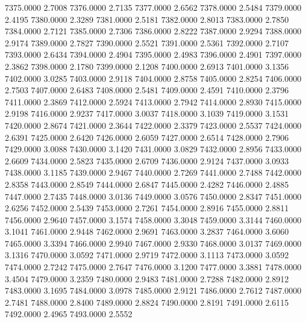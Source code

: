 7375.0000      2.7008
7376.0000      2.7135
7377.0000      2.6562
7378.0000      2.5484
7379.0000      2.4195
7380.0000      2.3289
7381.0000      2.5181
7382.0000      2.8013
7383.0000      2.7850
7384.0000      2.7121
7385.0000      2.7306
7386.0000      2.8222
7387.0000      2.9294
7388.0000      2.9174
7389.0000      2.7827
7390.0000      2.5521
7391.0000      2.5361
7392.0000      2.7107
7393.0000      2.6434
7394.0000      2.4904
7395.0000      2.4983
7396.0000      2.4901
7397.0000      2.3862
7398.0000      2.1780
7399.0000      2.1208
7400.0000      2.6913
7401.0000      3.1356
7402.0000      3.0285
7403.0000      2.9118
7404.0000      2.8758
7405.0000      2.8254
7406.0000      2.7503
7407.0000      2.6483
7408.0000      2.5481
7409.0000      2.4591
7410.0000      2.3796
7411.0000      2.3869
7412.0000      2.5924
7413.0000      2.7942
7414.0000      2.8930
7415.0000      2.9198
7416.0000      2.9237
7417.0000      3.0037
7418.0000      3.1039
7419.0000      3.1531
7420.0000      2.8674
7421.0000      2.3644
7422.0000      2.3379
7423.0000      2.5537
7424.0000      2.6391
7425.0000      2.6420
7426.0000      2.6059
7427.0000      2.6514
7428.0000      2.7906
7429.0000      3.0088
7430.0000      3.1420
7431.0000      3.0829
7432.0000      2.8956
7433.0000      2.6609
7434.0000      2.5823
7435.0000      2.6709
7436.0000      2.9124
7437.0000      3.0933
7438.0000      3.1185
7439.0000      2.9467
7440.0000      2.7269
7441.0000      2.7488
7442.0000      2.8358
7443.0000      2.8549
7444.0000      2.6847
7445.0000      2.4282
7446.0000      2.4885
7447.0000      2.7435
7448.0000      3.0136
7449.0000      3.0576
7450.0000      2.8347
7451.0000      2.6256
7452.0000      2.5439
7453.0000      2.7261
7454.0000      2.8916
7455.0000      2.8811
7456.0000      2.9640
7457.0000      3.1574
7458.0000      3.3048
7459.0000      3.3144
7460.0000      3.1041
7461.0000      2.9448
7462.0000      2.9691
7463.0000      3.2837
7464.0000      3.6060
7465.0000      3.3394
7466.0000      2.9940
7467.0000      2.9330
7468.0000      3.0137
7469.0000      3.1316
7470.0000      3.0592
7471.0000      2.9719
7472.0000      3.1113
7473.0000      3.0592
7474.0000      2.7242
7475.0000      2.7647
7476.0000      3.1200
7477.0000      3.3881
7478.0000      3.4504
7479.0000      3.2359
7480.0000      2.9483
7481.0000      2.7288
7482.0000      2.8912
7483.0000      3.1695
7484.0000      3.0978
7485.0000      2.9121
7486.0000      2.7612
7487.0000      2.7481
7488.0000      2.8400
7489.0000      2.8824
7490.0000      2.8191
7491.0000      2.6115
7492.0000      2.4965
7493.0000      2.5552
